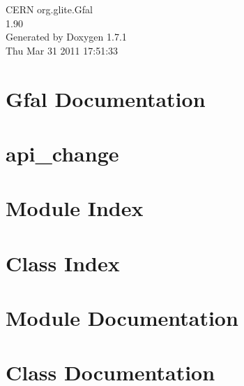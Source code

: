 \documentclass[a4paper]{book}
\begin{document}
\begin{titlepage}
\vspace*{7cm}
\begin{center}
{\Large CERN org.glite.Gfal \\[1ex]\large 1.90 }\\
\vspace*{1cm}
{\large Generated by Doxygen 1.7.1}\\
\vspace*{0.5cm}
{\small Thu Mar 31 2011 17:51:33}\\
\end{center}
\end{titlepage}
\clearemptydoublepage
{}
\tableofcontents
\clearemptydoublepage
{}
\chapter{Gfal Documentation}
\label{index}
\chapter{api\_\-change}
\label{api_change}

\chapter{Module Index}

\chapter{Class Index}

\chapter{Module Documentation}







\chapter{Class Documentation}














\printindex
\end{document}
